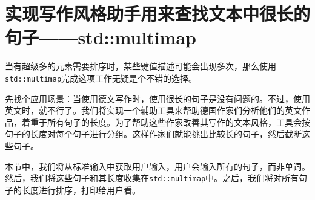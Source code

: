 \section{实现写作风格助手用来查找文本中很长的句子——std::multimap}

当有超级多的元素需要排序时，某些键值描述可能会出现多次，那么使用\texttt{std::multimap}完成这项工作无疑是个不错的选择。

先找个应用场景：当使用德文写作时，使用很长的句子是没有问题的。不过，使用英文时，就不行了。我们将实现一个辅助工具来帮助德国作家们分析他们的英文作品，着重于所有句子的长度。为了帮助这些作家改善其写作的文本风格，工具会按句子的长度对每个句子进行分组。这样作家们就能挑出比较长的句子，然后截断这些句子。


本节中，我们将从标准输入中获取用户输入，用户会输入所有的句子，而非单词。然后，我们将这些句子和其长度收集在\texttt{std::multimap}中。之后，我们将对所有句子的长度进行排序，打印给用户看。

